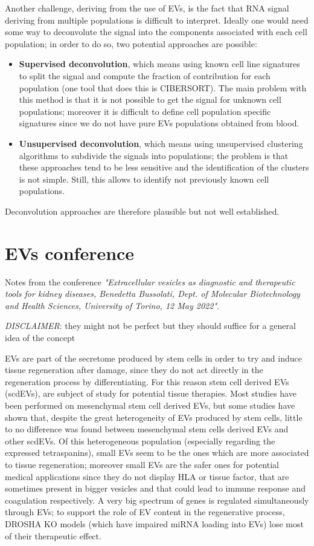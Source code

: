   Another challenge, deriving from the use of EVs, is the fact that RNA signal deriving from multiple populations is difficult to interpret. Ideally one would need some way to deconvolute the signal into the components associated with each cell population; in order to do so, two potential approaches are possible: 
  \begin{itemize}
    \item \textbf{Supervised deconvolution}, which means using known cell line signatures to split the signal and compute the fraction of contribution for each population (one tool that does this is CIBERSORT). The main problem with this method is that it is not possible to get the signal for unknown cell populations; moreover it is difficult to define cell population specific signatures since we do not have pure EVs populations obtained from blood. 
    \item \textbf{Unsupervised deconvolution}, which means using unsupervised clustering algorithms to subdivide the signals into populations; the problem is that these approaches tend to be less sensitive and the identification of the clusters is not simple. Still, this allows to identify not previously known cell populations.
  \end{itemize}
  Deconvolution approaches are therefore plausible but not well established.

\section{EVs conference}
  Notes from the conference \textit{"Extracellular vesicles as diagnostic and therapeutic tools for kidney diseases, Benedetta Bussolati, Dept. of Molecular Biotechnology and Health Sciences, University of Torino, 12 May 2022"}.

  \textit{DISCLAIMER}: they might not be perfect but they should suffice for a general idea of the concept
  
  EVs are part of the secretome produced by stem cells in order to try and induce tissue regeneration after damage, since they do not act directly in the regeneration process by differentiating. For this reason stem cell derived EVs (scdEVs), are subject of study for potential tissue therapies. Most studies have been performed on mesenchymal stem cell derived EVs, but some studies have shown that, despite the great heterogeneity of EVs produced by stem cells, little to no difference was found between mesenchymal stem cells derived EVs and other scdEVs. Of this heterogeneous population (especially regarding the expressed tetraspanins), small EVs seem to be the ones which are more associated to tissue regeneration; moreover small EVs are the safer ones for potential medical applications since they do not display HLA or tissue factor, that are sometimes present in bigger vesicles and that could lead to immune response and coagulation respectively. A very big spectrum of genes is regulated simultaneously through EVs; to support the role of EV content in the regenerative process, DROSHA KO models (which have impaired miRNA loading into EVs) lose most of their therapeutic effect.

